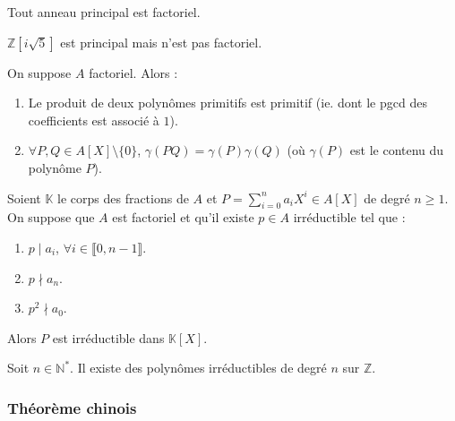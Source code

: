 	\begin{theorem}
		\label{122-4}
		Tout anneau principal est factoriel.
	\end{theorem}

	\begin{cexample}
		$\mathbb{Z}[i\sqrt{5}]$ est principal mais n'est pas factoriel.
	\end{cexample}


	\begin{lemma}[Gauss]
		On suppose $A$ factoriel. Alors :
		\begin{enumerate}[label=(\roman*)]
			\item Le produit de deux polynômes primitifs est primitif (ie. dont le pgcd des coefficients est associé à $1$).
			\item $\forall P, Q \in A[X] \setminus \{ 0 \}$, $\gamma(PQ) = \gamma(P) \gamma(Q)$ (où $\gamma(P)$ est le contenu du polynôme $P$).
		\end{enumerate}
	\end{lemma}


	\begin{theorem}
		Soient $\mathbb{K}$ le corps des fractions de $A$ et $P = \sum_{i=0}^n a_i X^i \in A[X]$ de degré $n \geq 1$. On suppose que $A$ est factoriel et qu'il existe $p \in A$ irréductible tel que :
		\begin{enumerate}[label=(\roman*)]
			\item $p \mid a_i$, $\forall i \in \llbracket 0, n-1 \rrbracket$.
			\item $p \nmid a_n$.
			\item $p^2 \nmid a_0$.
		\end{enumerate}
		Alors $P$ est irréductible dans $\mathbb{K}[X]$.
	\end{theorem}


	\begin{application}
		Soit $n \in \mathbb{N}^*$. Il existe des polynômes irréductibles de degré $n$ sur $\mathbb{Z}$.
	\end{application}

	\subsubsection{Théorème chinois}


